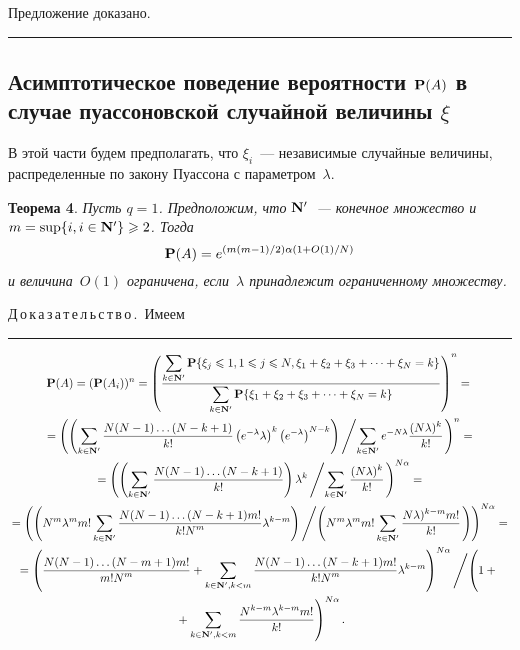 \noindent
Предложение доказано.
\smallskip

\hrule



\begin{multicols}{2}

\bigskip

\section{Асимптотическое поведение вероятности  ${\bf P}(A)$ в случае
пуассоновской случайной величины $\xi$}

 В этой части будем предполагать, что $\xi_i$~--- независимые случайные
 величины, распределенные по закону Пуассона с параметром~$\lambda$.

\medskip

\noindent
{\bf Теорема 4}. {\it Пусть $q=1$. Предположим, что ${\bf N'}$~---
конечное множество и $m=\sup\{i, i\in{\bf N'}\}\ge 2$.  Тогда
\begin{equation*}
{\bf P}(A)=
e^{(m(m-1)/2)\alpha\left(1+O(1)/N\right)}
\end{equation*}
и величина~$O(1)$ ограничена, если~$\lambda$ принадлежит
ограниченному множеству.}

\bigskip

\noindent
Д\,о\,к\,а\,з\,а\,т\,е\,л\,ь\,с\,т\,в\,о\,.\   Имеем

\end{multicols}
\pagebreak

\hrule

\noindent
\begin{multline*}
{\bf P}(A)=({\bf P}(A_i))^n=
\left(\fr{ \sum_{k\in{\bf N'}}{\bf P}\{\xi_j\le 1, 1\le j\le N,
\xi_1+\xi_2+\xi_3+\dots +\xi_N=k\}}{\sum_{k\in{\bf N'}}{\bf
P}\{\xi_1+\xi_2+\xi_3+\dots +\xi_N=k\}}\right)^n={}\\
{}= \left(\left({\sum\limits_{k\in{\bf N'}}
\fr{N(N-1)\dots (N-k+1)}{k!}\left(e^{-\lambda}\lambda\right)^k\left(e^{-\lambda}\right)^{N-k}}\right)\left/
\sum\limits_{k\in{\bf
N'}}e^{-N\lambda} \fr{(N\lambda)^k}{k!}\right.\right)^n={}\\
{}= \left(\left(\sum\limits_{k\in{\bf N'}}
\fr{N(N-1)\dots (N-k+1)}{k!}\right)\lambda^k\left/ \sum\limits_{k\in{\bf N'}}
\fr{(N\lambda)^k}{k!}\right.\right)^{N\alpha}={}\\
{}=\left(\left(N^m\lambda^m m!\sum\limits_{k\in{\bf N'}}
\fr{N(N-1)\dots (N-k+1)m!}{k!N^m}\lambda^{k-m}\right)\left/ \left(N^m\lambda^mm!\sum\limits_{k\in{\bf N'}}
\fr{N\lambda)^{k-m}m!}{k!}\right.\right)\right)^{N\alpha}={}\\
{}=
\left(\fr{N(N-1)\dots (N-m+1)m!}{m!N^m} +\sum\limits_{k\in{\bf
N'},k<m}
\fr{N(N-1)\dots (N-k+1)m!}{k!N^m}\lambda^{k-m}\right)^{N\alpha}\left/ \left(1+\vphantom{\sum\limits_{k\in{\bf N'},k<m}
\fr{N^{k-m}\lambda^{k-m}m!}{k!}}\right.\right.{}\\
\left.{}+
\sum\limits_{k\in{\bf N'},k<m}
\fr{N^{k-m}\lambda^{k-m}m!}{k!}\right)^{N\alpha}.
\end{multline*}


